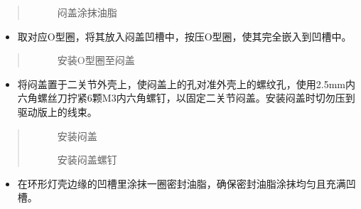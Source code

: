 \documentclass[a4paper,11pt,english,openany,oneside]{sphinxmanual}
\begin{document}
\begin{itemize}
\begin{quote}
\begin{figure}[H]
\centering
\capstart

\noindent{}
\caption{闷盖涂抹油脂}\label{\detokenize{_u66f4_u6362_u5173_u8282:id136}}\end{figure}
\end{quote}
\begin{itemize}
\item {} 
\sphinxAtStartPar
取对应O型圈，将其放入闷盖凹槽中，按压O型圈，使其完全嵌入到凹槽中。

\end{itemize}
\begin{quote}

\begin{figure}[H]
\centering
\capstart

\noindent{}
\caption{安装O型圈至闷盖}\label{\detokenize{_u66f4_u6362_u5173_u8282:id137}}\end{figure}
\end{quote}
\begin{itemize}
\item {} 
\sphinxAtStartPar
将闷盖置于二关节外壳上，使闷盖上的孔对准外壳上的螺纹孔，使用2.5mm内六角螺丝刀拧紧6颗M3内六角螺钉，以固定二关节闷盖。安装闷盖时切勿压到驱动版上的线束。

\end{itemize}
\begin{quote}

\begin{figure}[H]
\centering
\capstart

\noindent{}
\caption{安装闷盖}\label{\detokenize{_u66f4_u6362_u5173_u8282:id138}}\end{figure}

\begin{figure}[H]
\centering
\capstart

\noindent{}
\caption{安装闷盖螺钉}\label{\detokenize{_u66f4_u6362_u5173_u8282:id139}}\end{figure}
\end{quote}
\begin{itemize}
\item {} 
\sphinxAtStartPar
在环形灯壳边缘的凹槽里涂抹一圈密封油脂，确保密封油脂涂抹均匀且充满凹槽。

\end{itemize}
\begin{quote}


\end{quote}
\end{itemize}
\end{document}
